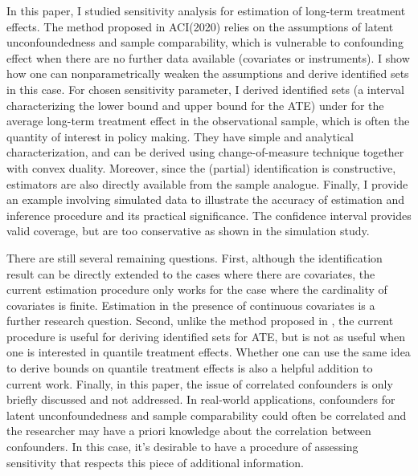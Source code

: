 \documentclass[12pt]{article}
\begin{document}
  In this paper, I studied sensitivity analysis for estimation of long-term treatment effects.
  The method proposed in ACI(2020) relies on the assumptions of latent unconfoundedness and sample comparability, which is vulnerable to confounding effect when there are no further data available (covariates or instruments).
  I show how one can nonparametrically weaken the assumptions and derive identified sets in this case.
  For chosen sensitivity parameter, I derived identified sets (a interval characterizing the lower bound and upper bound for the ATE) under for the average long-term treatment effect in the observational sample, which is often the quantity of interest in policy making.
  They have simple and analytical characterization, and can be derived using change-of-measure technique together with convex duality. 
  Moreover, since the (partial) identification is constructive, estimators are also directly available from the sample analogue.
  Finally, I provide an example involving simulated data to illustrate the accuracy of estimation and inference procedure and its practical significance. The confidence interval provides valid coverage, but are too conservative as shown in the simulation study.

  There are still several remaining questions. 
  First, although the identification result can be directly extended to the cases where there are covariates, the current estimation procedure only works for the case where the cardinality of covariates is finite. Estimation in the presence of continuous covariates is a further research question. Second, unlike the method proposed in \textcite{masten2018identification}, 
  the current procedure is useful for deriving identified sets for ATE, but is not as useful when one is interested in quantile treatment effects. Whether one can use the same idea to derive bounds on quantile treatment effects is also a helpful addition to current work. Finally, in this paper, the issue of correlated confounders is only briefly discussed and not addressed. In real-world applications, confounders for latent unconfoundedness and sample comparability could often be correlated and the researcher may have a priori knowledge about the correlation between confounders. In this case, it's desirable to have a procedure of assessing sensitivity that respects this piece of additional information. 
    
	\medskip
	
	\pagebreak
	\nocite{*}
	\printbibliography
	
	\pagebreak
	\appendix
\end{document}
